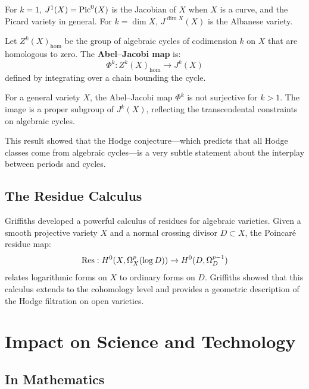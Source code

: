 For $k = 1$, $J^1(X) = \operatorname{Pic}^0(X)$ is the Jacobian of $X$ when $X$ is a curve, and the Picard variety in general. For $k = \dim X$, $J^{\dim X}(X)$ is the Albanese variety.

\begin{definition}
Let $Z^k(X)_{\hom}$ be the group of algebraic cycles of codimension $k$ on $X$ that are homologous to zero. The \textbf{Abel--Jacobi map} is:
\[
\Phi^k: Z^k(X)_{\hom} \to J^k(X)
\]
defined by integrating over a chain bounding the cycle.
\end{definition}

\begin{theorem}[Griffiths, 1969]
For a general variety $X$, the Abel--Jacobi map $\Phi^k$ is not surjective for $k > 1$. The image is a proper subgroup of $J^k(X)$, reflecting the transcendental constraints on algebraic cycles.
\end{theorem}

This result showed that the Hodge conjecture---which predicts that all Hodge classes come from algebraic cycles---is a very subtle statement about the interplay between periods and cycles.

\subsection{The Residue Calculus}

Griffiths developed a powerful calculus of residues for algebraic varieties. Given a smooth projective variety $X$ and a normal crossing divisor $D \subset X$, the Poincar\'e residue map:
\[
\Res: H^0(X, \Omega_X^p(\log D)) \to H^0(D, \Omega_D^{p-1})
\]
relates logarithmic forms on $X$ to ordinary forms on $D$. Griffiths showed that this calculus extends to the cohomology level and provides a geometric description of the Hodge filtration on open varieties.

\section{Impact on Science and Technology}

\subsection{In Mathematics}

